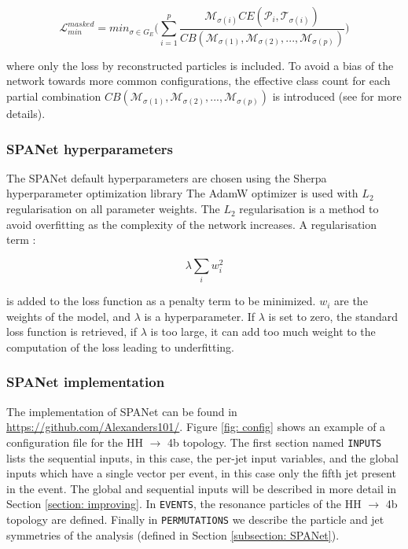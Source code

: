 \begin{equation}
    \mathcal{L}_{min}^{masked}=min_{\sigma \in G_E}\bigg( \sum_{i=1}^p \frac{\mathcal{M}_{\sigma(i)} CE(\mathcal{P}_i, \mathcal{T}_{\sigma(i)})}{CB(\mathcal{M}_{\sigma(1)}, \mathcal{M}_{\sigma(2)}, ..., \mathcal{M}_{\sigma(p)})}\bigg)
\end{equation}

\noindent where only the loss by reconstructed particles is included.  To avoid a bias of the network towards more common configurations, the effective class count for each partial combination $CB(\mathcal{M}_{\sigma(1)}, \mathcal{M}_{\sigma(2)}, ..., \mathcal{M}_{\sigma(p)})$ is introduced (see \cite{SPANet} for more details).

\subsubsection{SPANet hyperparameters}

The SPANet default hyperparameters are chosen using the Sherpa hyperparameter optimization library \cite{Sherpa} The AdamW optimizer \cite{AdamW} is used with $L_2$ regularisation on all parameter weights. The $L_2$ regularisation is a method to avoid overfitting as the complexity of the network increases. A regularisation term \cite{L2reg}:

\begin{equation}
    \lambda \sum_i w^2_i
\end{equation}

\noindent is added to the loss function as a penalty term to be minimized. $w_i$ are the weights of the model, and $\lambda$ is a hyperparameter. \cite{L2reg}
If $\lambda$ is set to zero,  the standard loss function is retrieved, if $\lambda$ is too large, it can add too much weight to the computation of the loss leading to underfitting.\cite{L2reg}


\subsubsection{SPANet implementation}

The implementation of SPANet can be found in  \url{https://github.com/Alexanders101/}. Figure \ref{fig: config} shows an example of a configuration file for the HH $\to$ 4b topology. The first section named \verb|INPUTS| lists the sequential inputs, in this case, the per-jet input variables, and the global inputs which have a single vector per event, in this case only the fifth jet present in the event. The global and sequential inputs will be described in more detail in Section \ref{section: improving}. In \verb|EVENTS|, the resonance particles of the HH $\to$ 4b topology are defined. Finally in \verb|PERMUTATIONS| we describe the particle and jet symmetries of the analysis (defined in Section \ref{subsection: SPANet}).

